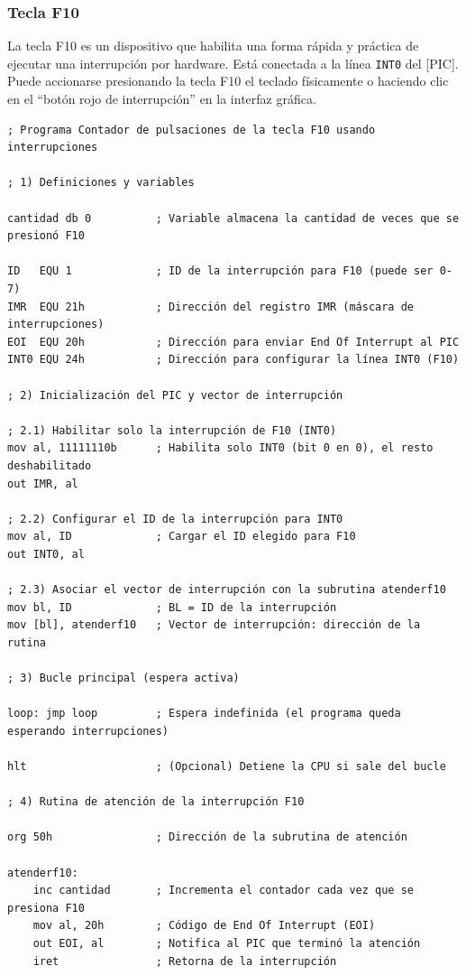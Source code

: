 \documentclass[12pt,oneside]{templates/unerthesis}
\begin{document}
\hypertarget{tecla-f10}{%
\subsubsection{Tecla F10}\label{tecla-f10}}

La tecla F10 es un dispositivo que habilita una forma rápida y práctica de ejecutar una interrupción por hardware. Está conectada a la línea \texttt{INT0} del {[}PIC{]}. Puede accionarse presionando la tecla F10 el teclado físicamente o haciendo clic en el ``botón rojo de interrupción'' en la interfaz gráfica.

\begin{lstlisting}
; Programa Contador de pulsaciones de la tecla F10 usando interrupciones

; 1) Definiciones y variables

cantidad db 0          ; Variable almacena la cantidad de veces que se presionó F10

ID   EQU 1             ; ID de la interrupción para F10 (puede ser 0-7)
IMR  EQU 21h           ; Dirección del registro IMR (máscara de interrupciones)
EOI  EQU 20h           ; Dirección para enviar End Of Interrupt al PIC
INT0 EQU 24h           ; Dirección para configurar la línea INT0 (F10)

; 2) Inicialización del PIC y vector de interrupción

; 2.1) Habilitar solo la interrupción de F10 (INT0)
mov al, 11111110b      ; Habilita solo INT0 (bit 0 en 0), el resto deshabilitado
out IMR, al

; 2.2) Configurar el ID de la interrupción para INT0
mov al, ID             ; Cargar el ID elegido para F10
out INT0, al

; 2.3) Asociar el vector de interrupción con la subrutina atenderf10
mov bl, ID             ; BL = ID de la interrupción
mov [bl], atenderf10   ; Vector de interrupción: dirección de la rutina

; 3) Bucle principal (espera activa)

loop: jmp loop         ; Espera indefinida (el programa queda esperando interrupciones)

hlt                    ; (Opcional) Detiene la CPU si sale del bucle

; 4) Rutina de atención de la interrupción F10

org 50h                ; Dirección de la subrutina de atención

atenderf10:
    inc cantidad       ; Incrementa el contador cada vez que se presiona F10
    mov al, 20h        ; Código de End Of Interrupt (EOI)
    out EOI, al        ; Notifica al PIC que terminó la atención
    iret               ; Retorna de la interrupción\end{lstlisting}
\end{document}
